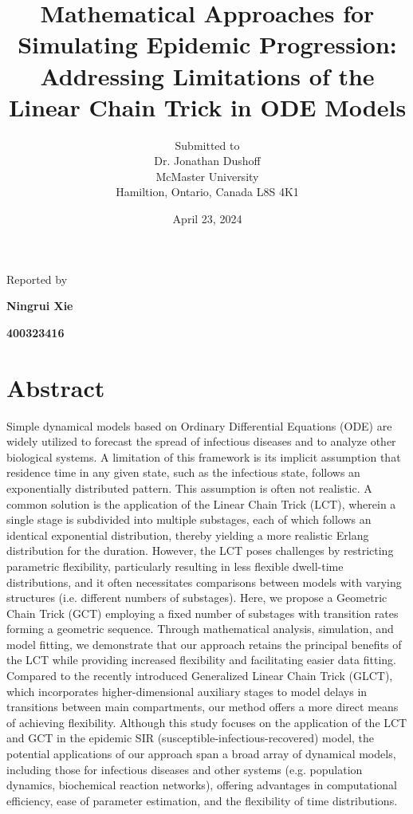 \documentclass[12pt]{article}
\begin{document}
\title{Mathematical Approaches for Simulating Epidemic Progression: Addressing Limitations of the Linear Chain Trick in ODE Models}

\author{Submitted to\\ Dr. Jonathan Dushoff 
\\McMaster University\\Hamiltion, Ontario, Canada L8S 4K1}
\date {April 23, 2024}
\maketitle


\centerline{Reported by}
\centerline{\textbf{Ningrui Xie}}
\centerline{\textbf{400323416}}


\newpage
\section*{Abstract}
Simple dynamical models based on Ordinary Differential Equations (ODE) are widely utilized to forecast the spread of infectious diseases and to analyze other biological systems. A limitation of this framework is its implicit assumption that residence time in any given state, such as the infectious state, follows an exponentially distributed pattern. This assumption is often not realistic. A common solution is the application of the Linear Chain Trick (LCT), wherein a single stage is subdivided into multiple substages, each of which follows an identical exponential distribution, thereby yielding a more realistic Erlang distribution for the duration. However, the LCT poses challenges by restricting parametric flexibility, particularly resulting in less flexible dwell-time distributions, and it often necessitates comparisons between models with varying structures (i.e. different numbers of substages). Here, we propose a Geometric Chain Trick (GCT) employing a fixed number of substages with transition rates forming a geometric sequence. Through mathematical analysis, simulation, and model fitting, we demonstrate that our approach retains the principal benefits of the LCT while providing increased flexibility and facilitating easier data fitting. Compared to the recently introduced Generalized Linear Chain Trick (GLCT), which incorporates higher-dimensional auxiliary stages to model delays in transitions between main compartments, our method offers a more direct means of achieving flexibility. Although this study focuses on the application of the LCT and GCT in the epidemic SIR (susceptible-infectious-recovered) model, the potential applications of our approach span a broad array of dynamical models, including those for infectious diseases and other systems (e.g. population dynamics, biochemical reaction networks), offering advantages in computational efficiency, ease of parameter estimation, and the flexibility of time distributions.
\end{document}
